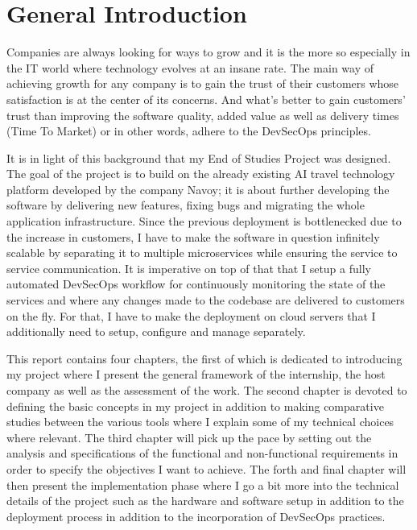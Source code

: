 \thispagestyle{plain} %
\section*{General Introduction}
Companies are always looking for ways to grow and it is the more so especially in the IT world where technology evolves at an insane rate. The main way of achieving growth for any company is to gain the trust of their customers whose satisfaction is at the center of its concerns.
And what's better to gain customers' trust than improving the software quality, added value as well as delivery times (Time To Market) or in other words, adhere to the DevSecOps principles.

It is in light of this background that my End of Studies Project was designed. The goal of the project is to build on the already existing AI travel technology platform developed by the company Navoy; it is about further developing the software by delivering new features, fixing bugs and migrating the whole application infrastructure.
Since the previous deployment is bottlenecked due to the increase in customers, I have to make the software in question infinitely scalable by separating it to multiple microservices while ensuring the service to service communication.
It is imperative on top of that that I setup a fully automated DevSecOps workflow for continuously monitoring the state of the services and where any changes made to the codebase are delivered to customers on the fly.
For that, I have to make the deployment on cloud servers that I additionally need to setup, configure and manage separately.

This report contains four chapters, the first of which is dedicated to introducing my project where I present the general framework of the internship, the host company as well as the assessment of the work.
The second chapter is devoted to defining the basic concepts in my project in addition to making comparative studies between the various tools where I explain some of my technical choices where relevant.
The third chapter will pick up the pace by setting out the analysis and specifications of the functional and non-functional requirements in order to specify the objectives I want to achieve. The forth and final chapter will then present the implementation phase where I go a bit more into the technical details of the project such as the hardware and software setup in addition to the deployment process in addition to the incorporation of DevSecOps practices.

\newpage
